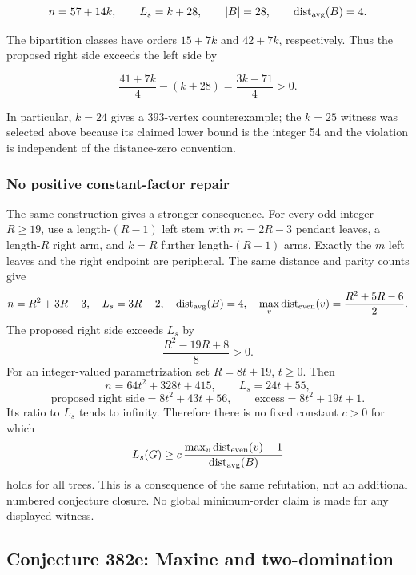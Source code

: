\documentclass[11pt,a4paper]{article}
\theoremstyle{definition}\newtheorem{definition}[theorem]{Definition}
\theoremstyle{remark}\newtheorem{remark}[theorem]{Remark}
\begin{document}
\[n=57+14k,\qquad L_s=k+28,\qquad |B|=28,\qquad \operatorname{dist}_{\rm avg}(B)=4.\]

The bipartition classes have orders \(15+7k\) and \(42+7k\),
respectively. Thus the proposed right side exceeds the left side by

\[\frac{41+7k}{4}-(k+28)=\frac{3k-71}{4}>0.\]

In particular, \(k=24\) gives a 393-vertex counterexample; the \(k=25\)
witness was selected above because its claimed lower bound is the
integer 54 and the violation is independent of the distance-zero
convention.


\subsubsection{No positive constant-factor repair}
The same construction gives a stronger consequence. For every odd integer
$R\geq19$, use a length-$(R-1)$ left stem with $m=2R-3$ pendant leaves,
a length-$R$ right arm, and $k=R$ further length-$(R-1)$ arms.
Exactly the $m$ left leaves and the right endpoint are peripheral.
The same distance and parity counts give
\[
n=R^2+3R-3,\quad L_s=3R-2,\quad
\operatorname{dist}_{\rm avg}(B)=4,\quad
\max_v\operatorname{dist}_{\rm even}(v)=\frac{R^2+5R-6}{2}.
\]
The proposed right side exceeds $L_s$ by
\[
\frac{R^2-19R+8}{8}>0.
\]
For an integer-valued parametrization set $R=8t+19$, $t\geq0$. Then
\[
n=64t^2+328t+415,\qquad L_s=24t+55,
\]
\[
\text{proposed right side}=8t^2+43t+56,\qquad
\text{excess}=8t^2+19t+1.
\]
Its ratio to $L_s$ tends to infinity. Therefore there is no fixed
constant $c>0$ for which
\[
L_s(G)\geq c\,
\frac{\max_v\operatorname{dist}_{\rm even}(v)-1}
{\operatorname{dist}_{\rm avg}(B)}
\]
holds for all trees. This is a consequence of the same refutation, not
an additional numbered conjecture closure. No global minimum-order
claim is made for any displayed witness.


\subsection{Conjecture 382e: Maxine and two-domination}\label{late:382e}
\end{document}
